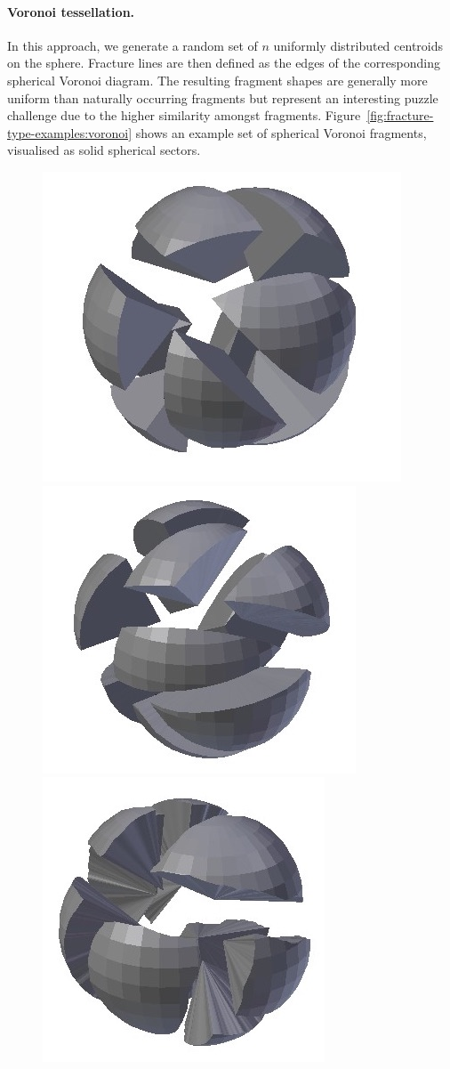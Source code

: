\documentclass[acmlarge,screen,dvipsnames]{acmart}
\begin{document}
\paragraph{Voronoi tessellation.}
%
In this approach, we generate a random set of $n$ uniformly
distributed centroids on the sphere. Fracture lines are then defined
as the edges of the corresponding spherical Voronoi diagram.
%
The resulting fragment shapes are generally more uniform than
naturally occurring fragments but represent an interesting puzzle
challenge due to the higher similarity amongst fragments.
%
Figure~\ref{fig:fracture-type-examples:voronoi} shows an example set
of spherical Voronoi fragments, visualised as solid spherical sectors.
%
\begin{figure}[htb]
  \centering%
  \vspace*{-2\baselineskip}%
  {\includegraphics[width=0.30\linewidth]{images/fractureBlender}}%
  \hspace{0.2in}%
  {\includegraphics[width=0.30\linewidth]{images/fracturelowamplitude}}%
  \hspace{0.2in}%
  {\includegraphics[width=0.30\linewidth]{images/fracturestandardsmooth}}%

\end{figure}
\end{document}
